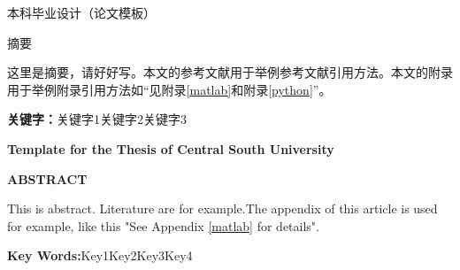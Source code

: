 \vspace*{-21.6pt}
\begin{center}
\heiti
本科毕业设计（论文模板）
\end{center}
\par
\begin{center}
	\heiti
	摘要
\end{center}

这里是摘要，请好好写。本文的参考文献用于举例参考文献引用方法\cite{IOTB2}。本文的附录用于举例附录引用方法如“见附录\ref{matlab}和附录\ref{python}”。
\par

\bigskip
\noindent\textbf{关键字：}关键字1\quad 关键字2\quad 关键字3

\newpage
\vspace*{-21.6pt}
\begin{center}
\bfseries
\rmfamily Template for the Thesis of Central South University
\end{center}
\par
{}
{}
\begin{center}
\rmfamily\bfseries
ABSTRACT
\end{center}

\par
This is abstract. Literature are for example\cite{IOTB2}.The appendix of this article is used for example, like this "See Appendix \ref{matlab} for details".

\bigskip
\noindent\textbf{Key Words:}\quad Key1\quad Key2\quad Key3\quad Key4
